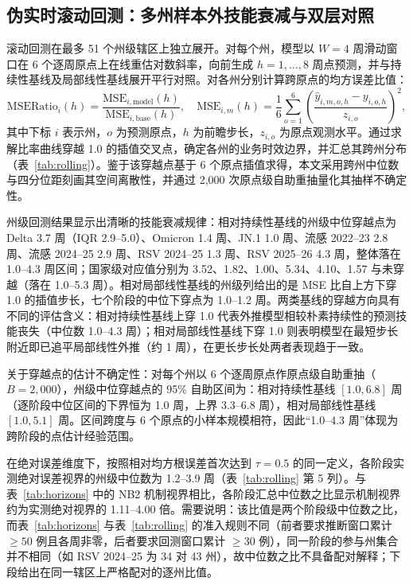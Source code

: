 \documentclass[11pt,a4paper]{article}
\theoremstyle{plain}
\theoremstyle{definition}
\begin{document}
\subsection{伪实时滚动回测：多州样本外技能衰减与双层对照}\label{sec:rolling_eval}

滚动回测在最多 51 个州级辖区上独立展开。对每个州，模型以 $W=4$ 周滑动窗口在 6 个逐周原点上在线重估对数斜率，向前生成 $h=1,\dots,8$ 周点预测，并与持续性基线及局部线性基线展开平行对照。对各州分别计算跨原点的均方误差比值：
\begin{equation}
\text{MSERatio}_{i}(h) = \frac{\text{MSE}_{i,\text{model}}(h)}{\text{MSE}_{i,\text{base}}(h)}, \quad \text{MSE}_{i,m}(h) = \frac{1}{6}\sum_{o=1}^{6}\left(\frac{\hat{y}_{i,m,o,h} - y_{i,o,h}}{z_{i,o}}\right)^2,
\end{equation}
其中下标 $i$ 表示州，$o$ 为预测原点，$h$ 为前瞻步长，$z_{i,o}$ 为原点观测水平。通过求解比率曲线穿越 1.0 的插值交叉点，确定各州的业务时效边界，并汇总其跨州分布（表~\ref{tab:rolling}）。鉴于该穿越点基于 6 个原点插值求得，本文采用跨州中位数与四分位距刻画其空间离散性，并通过 2,000 次原点级自助重抽量化其抽样不确定性。

州级回测结果显示出清晰的技能衰减规律：相对持续性基线的州级中位穿越点为 Delta 3.7 周（IQR 2.9--5.0）、Omicron 1.4 周、JN.1 1.0 周、流感 2022--23 2.8 周、流感 2024--25 2.9 周、RSV 2024--25 1.3 周、RSV 2025--26 4.3 周，整体落在 1.0--4.3 周区间；国家级对应值分别为 3.52、1.82、1.00、5.34、4.10、1.57 与未穿越（落在 1.0--5.3 周）。相对局部线性基线的州级列给出的是 MSE 比自上方下穿 1.0 的插值步长，七个阶段的中位下穿点为 1.0--1.2 周。两类基线的穿越方向具有不同的评估含义：相对持续性基线上穿 1.0 代表外推模型相较朴素持续性的预测技能丧失（中位数 1.0--4.3 周）；相对局部线性基线下穿 1.0 则表明模型在最短步长附近即已追平局部线性外推（约 1 周），在更长步长处两者表现趋于一致。

关于穿越点的估计不确定性：对每个州以 6 个逐周原点作原点级自助重抽（$B=2{,}000$），州级中位穿越点的 95\% 自助区间为：相对持续性基线 $[1.0, 6.8]$ 周（逐阶段中位区间的下界恒为 1.0 周，上界 3.3--6.8 周），相对局部线性基线 $[1.0, 5.1]$ 周。区间跨度与 6 个原点的小样本规模相符，因此“1.0--4.3 周”体现为跨阶段的点估计经验范围。

在绝对误差维度下，按照相对均方根误差首次达到 $\tau = 0.5$ 的同一定义，各阶段实测绝对误差视界的州级中位数为 1.2--3.9 周（表~\ref{tab:rolling} 第 5 列）。与表~\ref{tab:horizons} 中的 NB2 机制视界相比，各阶段汇总中位数之比显示机制视界约为实测绝对视界的 1.11--4.00 倍。需要说明：该比值是两个阶段级中位数之比，而表~\ref{tab:horizons} 与表~\ref{tab:rolling} 的准入规则不同（前者要求推断窗口累计 $\ge 50$ 例且各周非零，后者要求回测窗口累计 $\ge 30$ 例），同一阶段的参与州集合并不相同（如 RSV 2024--25 为 34 对 43 州），故中位数之比不具备配对解释；下段给出在同一辖区上严格配对的逐州比值。
\end{document}
